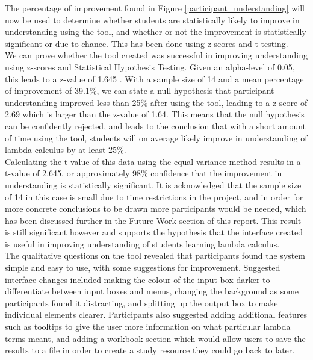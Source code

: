 \documentclass[a4paper,11pt]{report}
\begin{document}
The percentage of improvement found in Figure \ref{participant_understanding} will now be used to determine whether students are statistically likely to improve in understanding using the tool, and whether or not the improvement is statistically significant or due to chance. This has been done using z-scores and t-testing.\\

We can prove whether the tool created was successful in improving understanding using z-scores and Statistical Hypothesis Testing. Given an alpha-level of 0.05, this leads to a z-value of 1.645 \cite{ZTable2019}. With a sample size of 14 and a mean percentage of improvement of 39.1\%, we can state a null hypothesis that participant understanding improved less than 25\% after using the tool, leading to a z-score of 2.69 which is larger than the z-value of 1.64. This means that the null hypothesis can be confidently rejected, and leads to the conclusion that with a short amount of time using the tool, students will on average likely improve in understanding of lambda calculus by at least 25\%.\\

Calculating the t-value of this data using the equal variance method \cite{TTest2019} results in a t-value of 2.645, or approximately 98\% confidence that the improvement in understanding is statistically significant. It is acknowledged that the sample size of 14 in this case is small due to time restrictions in the project, and in order for more concrete conclusions to be drawn more participants would be needed, which has been discussed further in the Future Work section of this report. This result is still significant however and supports the hypothesis that the interface created is useful in improving understanding of students learning lambda calculus.\\

The qualitative questions on the tool revealed that participants found the system simple and easy to use, with some suggestions for improvement. Suggested interface changes included making the colour of the input box darker to differentiate between input boxes and menus, changing the background as some participants found it distracting, and splitting up the output box to make individual elements clearer. Participants also suggested adding additional features such as tooltips to give the user more information on what particular lambda terms meant, and adding a workbook section which would allow users to save the results to a file in order to create a study resource they could go back to later.\\
\end{document}
